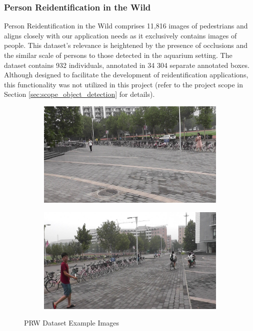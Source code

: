 \subsubsection{Person Reidentification in the Wild}
\label{sec:dataset_PRW}
Person Reidentification in the Wild comprises 11,816 images of pedestrians and aligns closely with our application needs as it exclusively contains images of people. This dataset's relevance is heightened by the presence of occlusions and the similar scale of persons to those detected in the aquarium setting. The dataset contains 932 individuals, annotated in 34 304 separate annotated boxes. Although designed to facilitate the development of reidentification applications, this functionality was not utilized in this project (refer to the project scope in Section \ref{sec:scope_object_detection} for details).

\begin{figure}[H]
    \centering
    \begin{subfigure}{0.49\textwidth}
        \centering
        \includegraphics[width=\textwidth]{Images/External_datasets/PRW_1.jpg}
    \end{subfigure}
    \hfill
    \begin{subfigure}{0.49\textwidth}
        \centering
        \includegraphics[width=\textwidth]{Images/External_datasets/PRW_2.jpg}
    \end{subfigure}
    \caption{\centering PRW Dataset Example Images}
    \label{fig:PRW_examples}
\end{figure}

